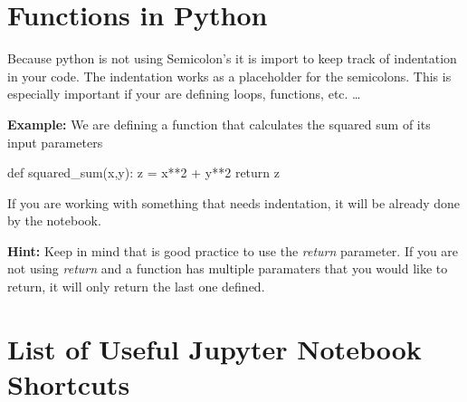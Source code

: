 \documentclass[
  letterpaper,
  DIV=11,
  numbers=noendperiod]{scrreprt}
\newenvironment{Shaded}{\begin{snugshade}}{\end{snugshade}}
\newcommand{\ControlFlowTok}[1]{\textcolor[rgb]{0.00,0.23,0.31}{#1}}
\newcommand{\DecValTok}[1]{\textcolor[rgb]{0.68,0.00,0.00}{#1}}
\newcommand{\KeywordTok}[1]{\textcolor[rgb]{0.00,0.23,0.31}{#1}}
\newcommand{\NormalTok}[1]{\textcolor[rgb]{0.00,0.23,0.31}{#1}}
\newcommand{\OperatorTok}[1]{\textcolor[rgb]{0.37,0.37,0.37}{#1}}
\begin{document}
\section{Functions in Python}\label{functions-in-python}

Because python is not using Semicolon's it is import to keep track of
indentation in your code. The indentation works as a placeholder for the
semicolons. This is especially important if your are defining loops,
functions, etc. \ldots{}

\textbf{Example:} We are defining a function that calculates the squared
sum of its input parameters

\begin{Shaded}
\begin{Highlighting}[]
\KeywordTok{def}\NormalTok{ squared\_sum(x,y): }
\NormalTok{    z }\OperatorTok{=}\NormalTok{ x}\OperatorTok{**}\DecValTok{2} \OperatorTok{+}\NormalTok{ y}\OperatorTok{**}\DecValTok{2}
    \ControlFlowTok{return}\NormalTok{ z}
\end{Highlighting}
\end{Shaded}

If you are working with something that needs indentation, it will be
already done by the notebook.

\textbf{Hint:} Keep in mind that is good practice to use the
\emph{return} parameter. If you are not using \emph{return} and a
function has multiple paramaters that you would like to return, it will
only return the last one defined.

\section{List of Useful Jupyter Notebook
Shortcuts}\label{list-of-useful-jupyter-notebook-shortcuts}
\end{document}
